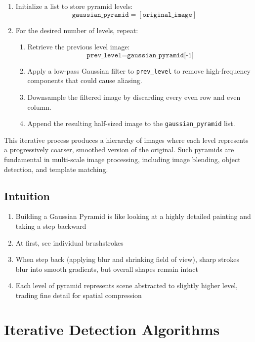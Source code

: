 \documentclass[12pt]{article}
\begin{document}
\begin{enumerate}
    \item Initialize a list to store pyramid levels:
          \[
              \texttt{gaussian\_pyramid} = [\texttt{original\_image}]
          \]
    \item For the desired number of levels, repeat:
          \begin{enumerate}
              \item Retrieve the previous level image:
                    \[
                        \texttt{prev\_level} = \texttt{gaussian\_pyramid[-1]}
                    \]
              \item Apply a low-pass Gaussian filter to \texttt{prev\_level} to remove high-frequency components that could cause aliasing.
              \item Downsample the filtered image by discarding every even row and even column.
              \item Append the resulting half-sized image to the \texttt{gaussian\_pyramid} list.
          \end{enumerate}
\end{enumerate}

This iterative process produces a hierarchy of images where each level represents a progressively coarser, smoothed version of the original. Such pyramids are fundamental in multi-scale image processing, including image blending, object detection, and template matching.


\subsection{Intuition}
\begin{enumerate}
    \item Building a Gaussian Pyramid is like looking at a highly detailed painting and taking a step backward
    \item At first, see individual brushstrokes
    \item When step back (applying blur and shrinking field of view), sharp strokes blur into smooth gradients, but overall shapes remain intact
    \item Each level of pyramid represents scene abstracted to slightly higher level, trading fine detail for spatial compression
\end{enumerate}


\section{Iterative Detection Algorithms}
\end{document}
